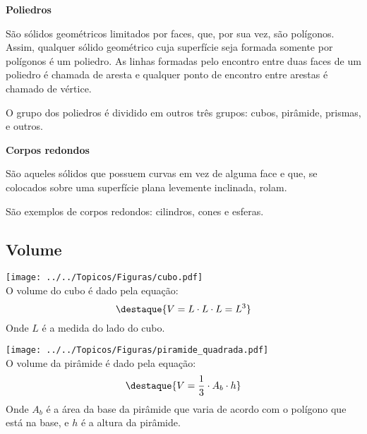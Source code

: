 \begin{figure}[H]
\center
{}
\qquad
{}
\qquad
{}
\qquad
{}

\end{figure}
 

 \textbf{Poliedros}
 
 São sólidos geométricos limitados por faces, que, por sua vez, são polígonos. Assim, qualquer sólido geométrico cuja superfície seja formada somente por polígonos é um poliedro. As linhas formadas pelo encontro entre duas faces de um poliedro é chamada de aresta e qualquer ponto de encontro entre arestas é chamado de vértice.

O grupo dos poliedros é dividido em outros três grupos: cubos, pirâmide, prismas, e outros.

\textbf{Corpos redondos}

São aqueles sólidos que possuem curvas em vez de alguma face e que, se colocados sobre uma superfície plana levemente inclinada, rolam. 

São exemplos de corpos redondos: cilindros, cones e esferas.

 \newpage
\subsection{Volume}

\begin{multicols}{2}
 \texttt{[image: ../../Topicos/Figuras/cubo.pdf]} \\
 
 O volume do cubo é dado pela equação:
 \[\destaque{V= L \cdot L \cdot L= L^3} \]
 Onde $L$ é a medida do lado do cubo.
\end{multicols}

\begin{multicols}{2}
 \texttt{[image: ../../Topicos/Figuras/piramide\_quadrada.pdf]} \\
 O volume da pirâmide é dado pela equação:
 \[\destaque{V= \frac{1}{3} \cdot A_b \cdot h }\]
 Onde $A_b$ é a área da base da pirâmide que varia de acordo com o polígono que está na base, e $h$ é a altura da pirâmide.
\end{multicols}

